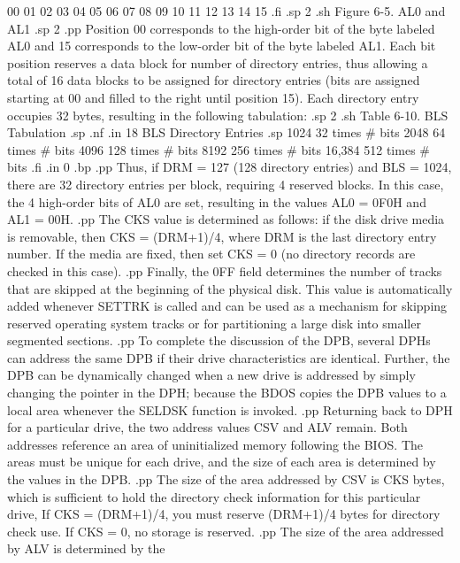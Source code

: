  00  01  02  03  04  05  06  07  08  09  10  11  12  13  14  15
.fi
.sp 2
.sh
                    Figure 6-5.  AL0 and AL1
.sp 2
.pp
Position 00 corresponds to the high-order bit of the byte 
labeled AL0 and 15 corresponds to the low-order bit of the byte 
labeled AL1.  Each bit position reserves a data block for number 
of directory entries, thus allowing a total of 16 data blocks to 
be assigned for directory entries (bits are assigned starting at 
00 and filled to the right until position 15).  Each directory 
entry occupies 32 bytes, resulting in the following tabulation:
.sp 2
.sh
                  Table 6-10.   BLS Tabulation
.sp
.nf
.in 18
 BLS         Directory Entries
.sp
  1024         32 times # bits
  2048         64 times # bits
  4096        128 times # bits
  8192        256 times # bits
16,384        512 times # bits
.fi
.in 0
.bp
.pp
Thus, if DRM = 127 (128 directory entries) and BLS = 1024, there 
are 32 directory entries per block, requiring 4 reserved blocks.  
In this case, the 4 high-order bits of AL0 are set, resulting in 
the values AL0 = 0F0H and AL1 = 00H.
.pp
The CKS value is determined as follows:  if the disk drive media is 
removable, then CKS = (DRM+1)/4, where DRM is the last directory 
entry number.  If the media are fixed, then set CKS = 0 (no 
directory records are checked in this case).
.pp
Finally, the 0FF field determines the number of tracks that are 
skipped at the beginning of the physical disk.  This value is 
automatically added whenever SETTRK is called and can be used as 
a mechanism for skipping reserved operating system tracks or for 
partitioning a large disk into smaller segmented sections.
.pp
To complete the discussion of the DPB, several DPHs can address 
the same DPB if their drive characteristics are identical.  
Further, the DPB can be dynamically changed when a new drive is 
addressed by simply changing the pointer in the DPH; because the 
BDOS copies the DPB values to a local area whenever the SELDSK 
function is invoked.
.pp
Returning back to DPH for a particular drive, the two address
values CSV and ALV remain.  Both addresses reference an area of 
uninitialized memory following the BIOS.  The areas must be 
unique for each drive, and the size of each area is determined by 
the values in the DPB.
.pp
The size of the area addressed by CSV is CKS bytes, which is 
sufficient to hold the directory check information for this 
particular drive,  If CKS = (DRM+1)/4, you must reserve (DRM+1)/4 
bytes for directory check use.  If CKS = 0, no storage is 
reserved.
.pp
The size of the area addressed by ALV is determined by the 

